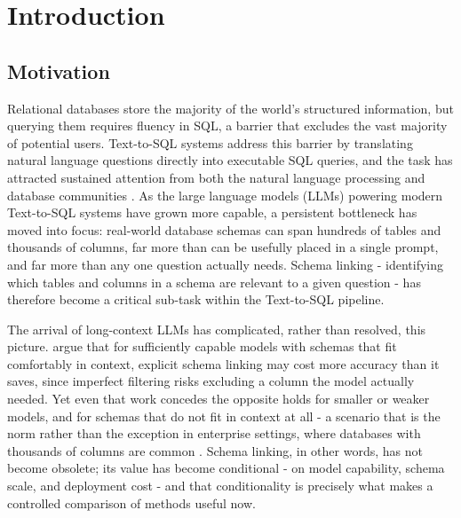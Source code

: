 \chapter{Introduction}\label{ch:1}

\section{Motivation}\label{sec:1-1}

Relational databases store the majority of the world's structured information, but querying them requires fluency in SQL, a barrier that excludes the vast majority of potential users. Text-to-SQL systems address this barrier by translating natural language questions directly into executable SQL queries, and the task has attracted sustained attention from both the natural language processing and database communities \citep{qin2022,liu2024}. As the large language models (LLMs) powering modern Text-to-SQL systems have grown more capable, a persistent bottleneck has moved into focus: real-world database schemas can span hundreds of tables and thousands of columns, far more than can be usefully placed in a single prompt, and far more than any one question actually needs. Schema linking - identifying which tables and columns in a schema are relevant to a given question - has therefore become a critical sub-task within the Text-to-SQL pipeline.

The arrival of long-context LLMs has complicated, rather than resolved, this picture. \citet{maamari2024} argue that for sufficiently capable models with schemas that fit comfortably in context, explicit schema linking may cost more accuracy than it saves, since imperfect filtering risks excluding a column the model actually needed. Yet even that work concedes the opposite holds for smaller or weaker models, and for schemas that do not fit in context at all - a scenario that is the norm rather than the exception in enterprise settings, where databases with thousands of columns are common \citep{wang2025b}. Schema linking, in other words, has not become obsolete; its value has become conditional - on model capability, schema scale, and deployment cost - and that conditionality is precisely what makes a controlled comparison of methods useful now.

